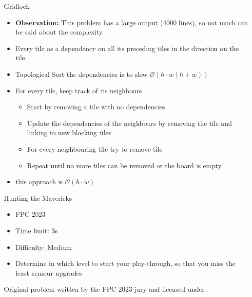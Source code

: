 \documentclass[11pt,pdf, aspectratio=169]{beamer}
\begin{document}
  \begin{frame}{Gridlock}
    \begin{itemize}
      \item<1-> \textbf{Observation:} This problem has a large output (4000 lines), so not much can be said about the complexity
      \item<2-> Every tile as a dependency on all its preceding tiles in the direction on the tile.
      \item<2-> Topological Sort the dependencies is to slow $\mathcal{O}(h\cdot w(h+w))$
      \item<3-> For every tile, keep track of its neighbours
      \begin{itemize}
        \item<4-> Start by removing a tile with no dependencies
        \item<4-> Update the dependencies of the neighbours by removing the tile and linking to new blocking tiles
        \item<4-> For every neighbouring tile try to remove tile
        \item<4-> Repeat until no more tiles can be removed or the board is empty
      \end{itemize}
      \item<5-> this approach is $\mathcal{O}(h\cdot w)$
    \end{itemize}
  \end{frame}
  \begin{frame}{Hunting the Mavericks}
    \begin{itemize}
      \item FPC 2023
      \item Time limit: 3s
      \item Difficulty: Medium
      \item Determine in which level to start your play-through, so that you miss the least armour upgrades
    \end{itemize}
    Original problem written by the FPC 2023 jury and licensed under \doclicenseLongNameRef.

    \doclicenseImage

  \end{frame}
\end{document}
